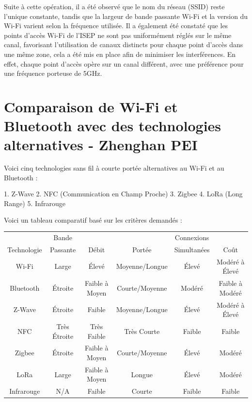 \documentclass[12]{article}
\begin{document}
Suite à cette opération, il a été observé que le nom du réseau (SSID) reste l'unique constante, tandis que la largeur de bande passante Wi-Fi et la version du Wi-Fi varient selon la fréquence utilisée. Il a également été constaté que les points d’accès Wi-Fi de l’ISEP ne sont pas uniformément réglés sur le même canal, favorisant l'utilisation de canaux distincts pour chaque point d'accès dans une même zone, cela a été mis en place afin de minimiser les interférences. En effet, chaque point d’accès opère sur un canal différent, avec une préférence pour une fréquence porteuse de 5GHz.




\section{Comparaison de Wi-Fi et Bluetooth avec des technologies alternatives - Zhenghan PEI}

Voici cinq technologies sans fil à courte portée alternatives au Wi-Fi et au Bluetooth :

1. Z-Wave
2. NFC (Communication en Champ Proche)
3. Zigbee
4. LoRa (Long Range)
5. Infrarouge

Voici un tableau comparatif basé sur les critères demandés :

\begin{center}
\begin{tabular}{|c|c|c|c|c|c|}
\hline
 & Bande &  &  & Connexions &  \\
Technologie & Passante & Débit & Portée & Simultanées & Coût \\
\hline
Wi-Fi & Large & Élevé & Moyenne/Longue & Élevé & Modéré à Élevé \\
Bluetooth & Étroite & Faible à Moyen & Courte/Moyenne & Modéré & Faible à Modéré \\
Z-Wave & Étroite & Faible & Moyenne/Longue & Élevé & Modéré à Élevé \\
NFC & Très Étroite & Très Faible & Très Courte & Faible & Faible \\
Zigbee & Étroite & Faible à Moyen & Courte/Moyenne & Élevé & Modéré \\
LoRa & Large & Faible à Moyen & Longue & Élevé & Modéré \\
Infrarouge & N/A & Faible & Courte & Faible & Faible \\
\hline
\end{tabular}
\end{center}
\end{document}
